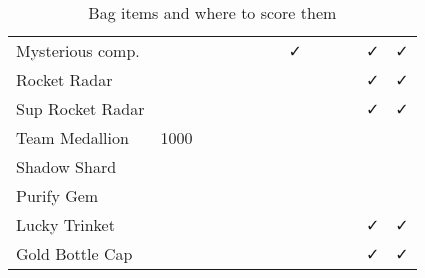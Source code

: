 \documentclass[ebook,10pt,openany,oneside]{memoir}
\begin{document}
\begin{table}
\begin{tabular}{p{}cccccccccccc}
Mysterious comp.  &      &   &     &    &    &     &  ✓  &     &   &   & ✓ & ✓ \\
Rocket Radar      &      &   &     &    &    &     &     &     &   &   & ✓ & ✓ \\ %
Sup Rocket Radar  &      &   &     &    &    &     &     &     &   &   & ✓ & ✓ \\
Team Medallion    & 1000 &   &     &    &    &     &     &     &   &   &   &   \\
Shadow Shard      &      &   &     &    &    &     &     &     &   &   &   &   \\
Purify Gem        &      &   &     &    &    &     &     &     &   &   &   &   \\
Lucky Trinket     &      &   &     &    &    &     &     &     &   &   & ✓ & ✓ \\
Gold Bottle Cap   &      &   &     &    &    &     &     &     &   &   & ✓ & ✓ \\
\end{tabular}
\caption{Bag items and where to score them\label{table:items}}
\end{table}
\end{document}
